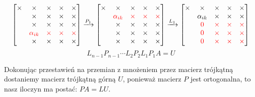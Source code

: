 \documentclass[a4paper]{article}
\begin{document}
\begin{equation*}
    \begin{bmatrix}
        \times & \times & \times & \times & \times \\
        & \times & \times & \times & \times \\
        & \times & \times & \times & \times \\
        & \textcolor{red}{\alpha_{ik}} & \textcolor{red}{\times} & \textcolor{red}{\times}& \textcolor{red}{\times} \\
        & \times & \times & \times & \times \\
    \end{bmatrix}
    \xrightarrow{P_1}
    \begin{bmatrix}
        \times & \times & \times & \times & \times \\
        & \textcolor{red}{\alpha_{ik}} & \textcolor{red}{\times} & \textcolor{red}{\times}& \textcolor{red}{\times} \\
        & \times & \times & \times & \times \\
        & \times & \times & \times & \times \\
        & \times & \times & \times & \times \\
    \end{bmatrix}
    \xrightarrow{L_1}
    \begin{bmatrix}
        \times & \times & \times & \times & \times \\
        & \alpha_{ik} & \times & \times & \times \\
        & \textcolor{red}{0} & \textcolor{red}{\times} & \textcolor{red}{\times} & \textcolor{red}{\times} \\
        & \textcolor{red}{0} & \textcolor{red}{\times} & \textcolor{red}{\times} & \textcolor{red}{\times} \\
        & \textcolor{red}{0} & \textcolor{red}{\times} & \textcolor{red}{\times} & \textcolor{red}{\times} \\
    \end{bmatrix}
\end{equation*}
\begin{equation*}
    L_{n-1}P_{n-1} \cdots L_2P_2L_1P_1A = U
\end{equation*}

Dokonując przestawień na przemian z mnożeniem przez macierz trójkątną dostaniemy macierz trójkątną górną $U$, ponieważ macierz $P$ jest ortogonalna, to nasz iloczyn ma postać: $PA = LU$.
\end{document}

